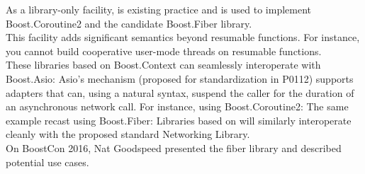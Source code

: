 \label{appendixa}
As a library-only facility,
\cite{bcontext} is existing practice
and is used to implement Boost.Coroutine2\cite{bcoroutine2} and the candidate
Boost.Fiber library\cite{bfiber}.\\
\newline
This facility adds significant semantics beyond resumable functions. For
instance, you cannot build cooperative user-mode threads on resumable
functions.\\
\newline
These libraries based on Boost.Context can seamlessly interoperate with
Boost.Asio\cite{basio}: Asio's  mechanism (proposed for
standardization in P0112\cite{P0112}) supports adapters that can, using a
natural syntax, suspend the caller for the duration of an asynchronous network
call. For instance, using Boost.Coroutine2:
The same example recast using Boost.Fiber:
Libraries based on \ectx will similarly interoperate cleanly with the proposed
standard Networking Library\cite{P0112}.\\
\newline
On BoostCon 2016, Nat Goodspeed\cite{fiberpres} presented the fiber library and
described potential use cases.
